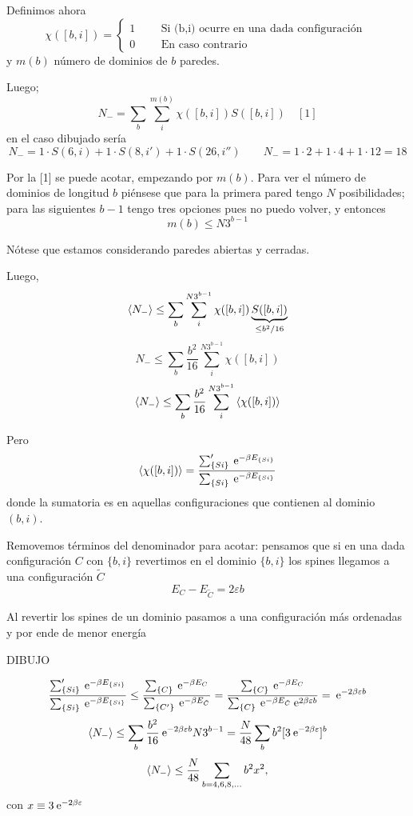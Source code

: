 \documentclass[10pt,oneside]{CBFT_book}
\begin{document}
Definimos ahora 
\[
	\chi([b,i]) = \begin{cases}
	              1 \qquad \text{ Si (b,i) ocurre en una dada configuración } \\
	              0 \qquad \text{ En caso contrario}
	             \end{cases}
\]
y $m(b)$ número de dominios de $b$ paredes.

Luego;
\[
	\boxed{ N_- = \sum_b \sum_i^{m(b)} \chi([b,i]) S([b,i]) } \quad [1]
\]
en el caso dibujado sería
\[
	N_- = 1 \cdot S(6,i) + 1 \cdot S(8,i') + 1 \cdot S(26,i'') \qquad 
	N_- = 1 \cdot  2 + 1 \cdot  4 + 1 \cdot 12 = 18
\]

Por la [1] se puede acotar, empezando por $m(b)$. Para ver el número de dominios de longitud $b$ piénsese que 
para la primera pared tengo $N$ posibilidades; para las siguientes $b-1$ tengo tres opciones pues no puedo volver,
y entonces 
\[
	m(b) \leq N 3^{b-1}
\]

Nótese que estamos considerando paredes abiertas y cerradas.

Luego,
\[
	\braket{N_-} \leq \sum_b \sum_i^{N3^{b-1}} \chi([b,i]) \underbrace{S([b,i])}_{\leq b^2/16}
\]
\[
	N_- \leq \sum_b \frac{b^2}{16} \sum_i^{N3^{b-1}} \chi([b,i])
\]
\[
	\braket{N_-} \leq \sum_b \frac{b^2}{16} \sum_i^{N3^{b-1}} \braket{\chi([b,i])}
\]

Pero
\[
	\braket{\chi([b,i])} = \frac{ \sum_{\{Si\}}' \:\mathrm{e}^{-\beta E_{\{Si\}}} }
	{ \sum_{\{Si\}} \:\mathrm{e}^{-\beta E_{\{Si\}}} }
\]
donde la sumatoria es en aquellas configuraciones que contienen al dominio $(b,i)$.


Removemos términos del denominador para acotar: pensamos que si en una dada configuración $C$ con $\{b,i\}$ revertimos 
en el dominio $\{b,i\}$ los spines llegamos a una configuración $\tilde{C}$
\[
	E_C - E_{\tilde{C}} = 2 \varepsilon b
\]

Al revertir los spines de un dominio pasamos a una configuración más ordenadas y por ende de menor energía
 
 DIBUJO
 
\[
	\frac{ \sum_{\{Si\}}' \:\mathrm{e}^{-\beta E_{\{Si\}}} }{ \sum_{\{Si\}} \:\mathrm{e}^{-\beta E_{\{Si\}}} }
	\leq 
	\frac{ \sum_{\{C\}} \:\mathrm{e}^{-\beta E_C} }{ \sum_{\{C'\}} \:\mathrm{e}^{-\beta E_{\tilde{C}}} } =
	\frac{ \sum_{\{C\}} \:\mathrm{e}^{-\beta E_C} }{ \sum_{\{C\}} \:\mathrm{e}^{-\beta E_{\tilde{C}}} 
	\:\mathrm{e}^{2\beta\varepsilon b} } = \:\mathrm{e}^{-2\beta \varepsilon b}
\] 
\[
	\braket{N_-} \leq \sum_b \frac{b^2}{16} \:\mathrm{e}^{-2\beta \varepsilon b} N 3^{b-1} =
	\frac{N}{48} \sum_b b^2 [ 3 \:\mathrm{e}^{-2\beta \varepsilon } ]^b
\]
\[
	\braket{N_-} \leq \frac{N}{48} \sum_{b=4,6,8,...} b^2 x^2,
\]
con $ x \equiv 3 \:\mathrm{e}^{-2\beta \varepsilon } $
\end{document}
